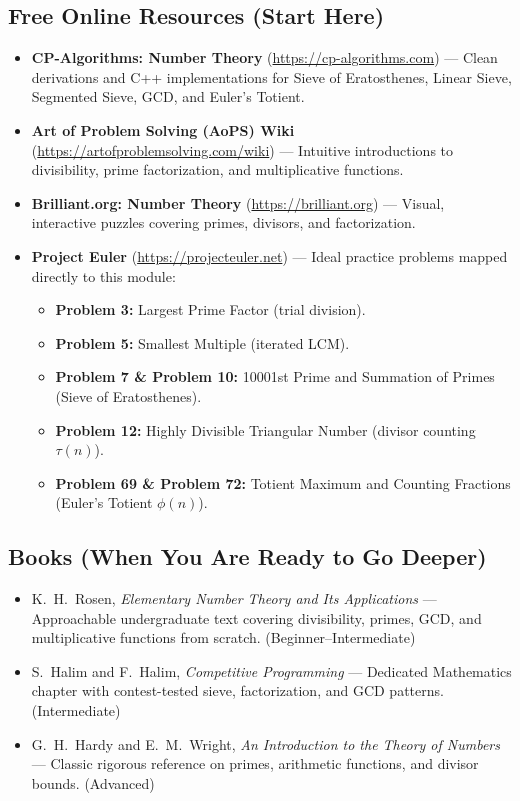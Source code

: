 \documentclass[11pt,a4paper]{article}
\theoremstyle{definition}
\begin{document}
\subsection*{Free Online Resources (Start Here)}
\begin{itemize}
    \item \textbf{CP-Algorithms: Number Theory} (\url{https://cp-algorithms.com}) --- Clean derivations and C++ implementations for Sieve of Eratosthenes, Linear Sieve, Segmented Sieve, GCD, and Euler's Totient.
    \item \textbf{Art of Problem Solving (AoPS) Wiki} (\url{https://artofproblemsolving.com/wiki}) --- Intuitive introductions to divisibility, prime factorization, and multiplicative functions.
    \item \textbf{Brilliant.org: Number Theory} (\url{https://brilliant.org}) --- Visual, interactive puzzles covering primes, divisors, and factorization.
    \item \textbf{Project Euler} (\url{https://projecteuler.net}) --- Ideal practice problems mapped directly to this module:
    \begin{itemize}
        \item \textbf{Problem 3:} Largest Prime Factor (trial division).
        \item \textbf{Problem 5:} Smallest Multiple (iterated LCM).
        \item \textbf{Problem 7 \& Problem 10:} 10001st Prime and Summation of Primes (Sieve of Eratosthenes).
        \item \textbf{Problem 12:} Highly Divisible Triangular Number (divisor counting $\tau(n)$).
        \item \textbf{Problem 69 \& Problem 72:} Totient Maximum and Counting Fractions (Euler's Totient $\phi(n)$).
    \end{itemize}
\end{itemize}

\subsection*{Books (When You Are Ready to Go Deeper)}
\begin{itemize}
    \item K.\ H.\ Rosen, \emph{Elementary Number Theory and Its Applications} --- Approachable undergraduate text covering divisibility, primes, GCD, and multiplicative functions from scratch. (Beginner--Intermediate)
    \item S.\ Halim and F.\ Halim, \emph{Competitive Programming} --- Dedicated Mathematics chapter with contest-tested sieve, factorization, and GCD patterns. (Intermediate)
    \item G.\ H.\ Hardy and E.\ M.\ Wright, \emph{An Introduction to the Theory of Numbers} --- Classic rigorous reference on primes, arithmetic functions, and divisor bounds. (Advanced)
\end{itemize}
\end{document}
